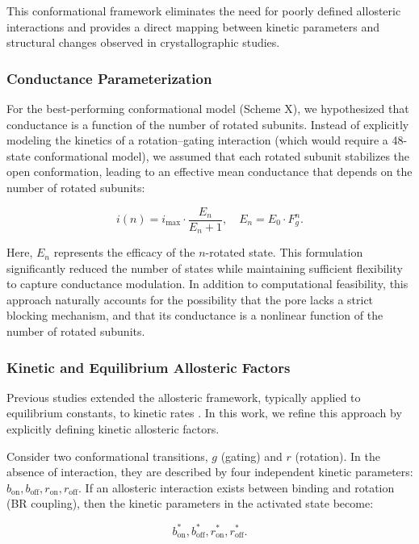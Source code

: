 \documentclass[pdflatex,sn-nature]{sn-jnl}%
\theoremstyle{thmstyleone}%
\theoremstyle{thmstyletwo}%
\theoremstyle{thmstylethree}%
\begin{document}
This conformational framework eliminates the need for poorly defined allosteric interactions and provides a direct mapping between kinetic parameters and structural changes observed in crystallographic studies.

\subsubsection{Conductance Parameterization}

For the best-performing conformational model (Scheme X), we hypothesized that conductance is a function of the number of rotated subunits. Instead of explicitly modeling the kinetics of a rotation–gating interaction (which would require a 48-state conformational model), we assumed that each rotated subunit stabilizes the open conformation, leading to an effective mean conductance that depends on the number of rotated subunits:

\[
i(n) = i_{\text{max}} \cdot \frac{E_n}{E_n + 1}, \quad E_n = E_0 \cdot F_g^n.
\]

Here, \( E_n \) represents the efficacy of the \( n \)-rotated state. This formulation significantly reduced the number of states while maintaining sufficient flexibility to capture conductance modulation. In addition to computational feasibility, this approach naturally accounts for the possibility that the pore lacks a strict blocking mechanism, and that its conductance is a nonlinear function of the number of rotated subunits.

\subsubsection{Kinetic and Equilibrium Allosteric Factors}

Previous studies extended the allosteric framework, typically applied to equilibrium constants, to kinetic rates \cite{Moffatt_hume}. In this work, we refine this approach by explicitly defining kinetic allosteric factors.

Consider two conformational transitions, \( g \) (gating) and \( r \) (rotation). In the absence of interaction, they are described by four independent kinetic parameters: \( b_{\text{on}}, b_{\text{off}}, r_{\text{on}}, r_{\text{off}} \). If an allosteric interaction exists between binding and rotation (BR coupling), then the kinetic parameters in the activated state become:

\[
b^*_{\text{on}}, b^*_{\text{off}}, r^*_{\text{on}}, r^*_{\text{off}}.
\]
\end{document}
